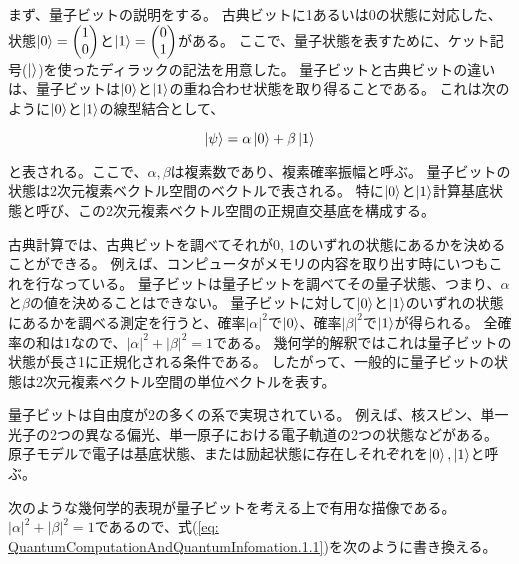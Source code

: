 \begin{comment}
    単一量子ビット
\end{comment}

まず、量子ビットの説明をする。
古典ビットに1あるいは0の状態に対応した、
状態$\ket{0} = \begin{pmatrix}
    1 \\
    0
\end{pmatrix}$と$\ket{1} = \begin{pmatrix}
    0 \\
    1
\end{pmatrix}$がある。
ここで、量子状態を表すために、ケット記号($\ket{}$)を使ったディラックの記法を用意した。
量子ビットと古典ビットの違いは、量子ビットは$\ket{0}$と$\ket{1}$の重ね合わせ状態を取り得ることである。
これは次のように$\ket{0}$と$\ket{1}$の線型結合として、

\begin{equation}
    \label{eq: QuantumComputationAndQuantumInfomation.1.1}
    \ket{\psi} = \alpha \ket{0} + \beta \ket{1}
\end{equation}

と表される。ここで、$\alpha, \beta$は複素数であり、複素確率振幅と呼ぶ。
量子ビットの状態は2次元複素ベクトル空間のベクトルで表される。
特に$\ket{0}$と$\ket{1}$計算基底状態と呼び、この2次元複素ベクトル空間の正規直交基底を構成する。

古典計算では、古典ビットを調べてそれが0, 1のいずれの状態にあるかを決めることができる。
例えば、コンピュータがメモリの内容を取り出す時にいつもこれを行なっている。
量子ビットは量子ビットを調べてその量子状態、つまり、$\alpha$と$\beta$の値を決めることはできない。
量子ビットに対して$\ket{0}$と$\ket{1}$のいずれの状態にあるかを調べる測定を行うと、確率$|\alpha|^2$で$\ket{0}$、確率$|\beta|^2$で$\ket{1}$が得られる。
全確率の和は$1$なので、$|\alpha|^2 + |\beta|^2 = 1$である。
幾何学的解釈ではこれは量子ビットの状態が長さ1に正規化される条件である。
したがって、一般的に量子ビットの状態は2次元複素ベクトル空間の単位ベクトルを表す。

\begin{comment}
    TODO: ここはもう少し具体的に修正
\end{comment}
量子ビットは自由度が2の多くの系で実現されている。
例えば、核スピン、単一光子の2つの異なる偏光、単一原子における電子軌道の2つの状態などがある。
原子モデルで電子は基底状態、または励起状態に存在しそれぞれを$\ket{0}, \ket{1}$と呼ぶ。

次のような幾何学的表現が量子ビットを考える上で有用な描像である。
$|\alpha|^2 + |\beta|^2 = 1$であるので、式(\ref{eq: QuantumComputationAndQuantumInfomation.1.1})を次のように書き換える。

